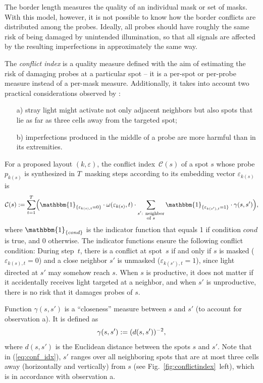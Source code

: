 \documentclass{w-edbk}
\newcommand{\eps}{\varepsilon}
\newcommand{\Ind}[1]{\mathbbm{1}_{\{{#1}\}}}
\begin{document}
The border length measures the quality of an individual mask or set of masks.
With this model, however, it is not possible to know how the border conflicts
are distributed among the probes. Ideally, all probes should have roughly the
same risk of being damaged by unintended illumination, so that all signals are
affected by the resulting imperfections in approximately the same way.

The \emph{conflict index} is a quality measure defined with the aim of
estimating the risk of damaging probes at a particular spot
\citep{Carvalho2006a} -- it is a per-spot or per-probe measure instead
of a per-mask measure.  Additionally, it takes into account two
practical considerations observed by \citet{Kahng2003}:
\begin{itemize}
\item[a)] stray light might activate not only adjacent neighbors but
  also spots that lie as far as three cells away from the targeted
  spot;
\item[b)] imperfections produced in the middle of a probe are more
  harmful than in its extremities.
\end{itemize}

For a proposed layout $(k,\eps)$, the conflict index~$\mathcal{C}(s)$
of a spot $s$ whose probe $p_{k(s)}$ is synthesized in $T$~masking
steps according to its embedding vector $\eps_{k(s)}$ is
\begin{equation}
\label{eq:conf_idx}
\mathcal{C}(s) := \sum_{t=1}^{T} \Bigl(
  \Ind{\eps_{k(s),t}=0}
  \cdot \omega(\eps_{k(s)},t)
  \cdot \sum_{\substack{s'\text{: neighbor}\\\text{of } s}}
  \Ind{\eps_{k(s'),t}=1}
  \cdot \gamma(s,s') \Bigr),
\end{equation}
where $\Ind{cond}$ is the indicator function that equals 1 if condition
$cond$ is true, and 0 otherwise. The indicator functions ensure the following
conflict condition: During step~$t$, there is a conflict at spot~$s$ if and
only if $s$ is masked ($\eps_{k(s),t}=0$) and a close neighbor
$s'$ is unmasked ($\eps_{k(s'),t}=1$), since light directed at
$s'$ may somehow reach $s$.  When $s$ is productive, it does not matter
if it accidentally receives light targeted at a neighbor, and when $s'$ is
unproductive, there is no risk that it damages probes of $s$.

Function $\gamma(s,s')$ is a ``closeness'' measure between $s$ and $s'$ (to
account for observation a). It is defined as
\begin{equation}\label{eq:dist_weight}
\gamma(s,s') := (d(s,s'))^{-2},\nopagebreak
\end{equation}\nopagebreak
where $d(s,s')$ is the Euclidean distance between the spots $s$ and $s'$. Note
that in (\ref{eq:conf_idx}), $s'$ ranges over all neighboring spots that are at
most three cells away (horizontally and vertically) from $s$ (see
Fig.~\ref{fig:conflictindex}~left), which is in accordance with observation a.
\end{document}

